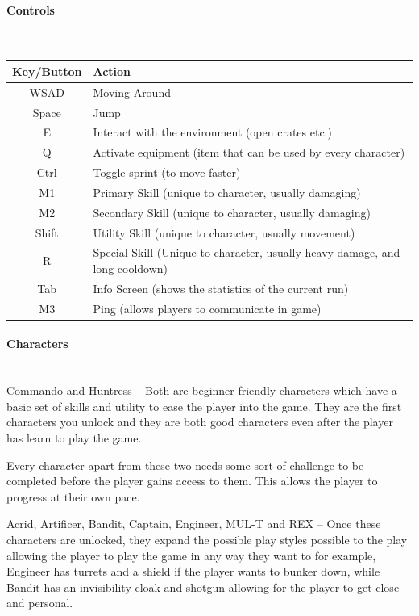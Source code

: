 \documentclass{article}
\newcommand{\parBr}{\vspace{5mm}}%
\newcommand{\myparagraph}[1]{\paragraph{#1}\mbox{}\\} %
\begin{document}
\myparagraph{Controls}
\begin{tabular}{c|l}
Key/Button & Action                                                                       \\ \hline
WSAD       & Moving Around                                                                \\
Space      & Jump                                                                         \\
E          & Interact with the environment (open crates etc.)                             \\
Q          & Activate equipment (item that can be used by every character)                \\
Ctrl       & Toggle sprint (to move faster)                                               \\
M1         & Primary Skill (unique to character, usually damaging)                        \\
M2         & Secondary Skill (unique to character, usually damaging)                      \\
Shift      & Utility Skill (unique to character, usually movement)                        \\
R          & Special Skill (Unique to character, usually heavy damage, and long cooldown) \\
Tab        & Info Screen (shows the statistics of the current run)                        \\
M3         & Ping (allows players to communicate in game)                                
\end{tabular}

\myparagraph{Characters}
Commando and Huntress – Both are beginner friendly characters which have a basic set of skills and utility to ease the player into the game. They are the first characters you unlock and they are both good characters even after the player has learn to play the game. 

\parBr

Every character apart from these two needs some sort of challenge to be completed before the player gains access to them. This allows the player to progress at their own pace. 

\parBr

Acrid, Artificer, Bandit, Captain, Engineer, MUL-T and REX – Once these characters are unlocked, they expand the possible play styles possible to the play allowing the player to play the game in any way they want to for example, Engineer has turrets and a shield if the player wants to bunker down, while Bandit has an invisibility cloak and shotgun allowing for the player to get close and personal. 
\end{document}
